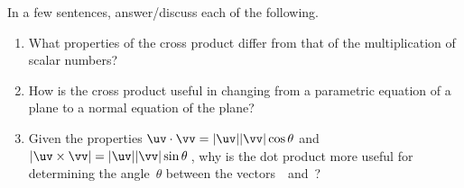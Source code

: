 \begin{exercise}  
In a few sentences, answer\slash discuss each of the following.
\begin{enumerate}
\item What properties of the cross product differ from that of the multiplication of scalar numbers?  

\item How is the cross product useful in changing from a parametric equation of a plane to a normal equation of the plane?

\item Given the properties \(\uv\cdot\vv=|\uv||\vv|\cos\theta\) and \(|\uv\times\vv|=|\uv||\vv|\sin\theta\)\,, why is the dot product more useful for determining the angle~\(\theta\) between the vectors~\uv\ and~\vv?

\end{enumerate}
\end{exercise}

